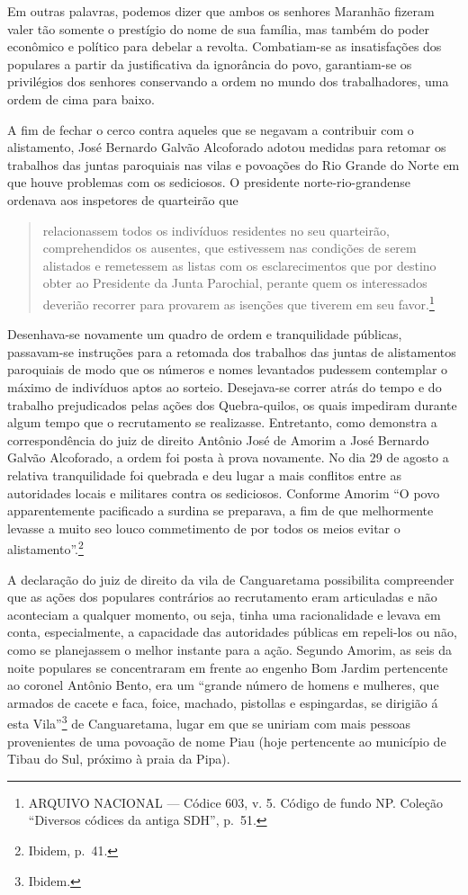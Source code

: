 \begin{refsection}
Em outras palavras, podemos dizer que ambos os senhores Maranhão fizeram valer tão somente o prestígio do nome de sua família, mas também do poder econômico e político para debelar a revolta. Combatiam-se as insatisfações dos populares a partir da justificativa da ignorância do povo, garantiam-se os privilégios dos senhores conservando a ordem no mundo dos trabalhadores, uma ordem de cima para baixo. 

A fim de fechar o cerco contra aqueles que se negavam a contribuir com o alistamento, José Bernardo Galvão Alcoforado adotou medidas para retomar os trabalhos das juntas paroquiais nas vilas e povoações do Rio Grande do Norte em que houve problemas com os sediciosos. O presidente norte-rio-grandense ordenava aos inspetores de quarteirão que  

\begin{quote}
    relacionassem todos os indivíduos residentes no seu quarteirão, comprehendidos os ausentes, que estivessem nas condições de serem alistados e remetessem  as listas com os esclarecimentos que por destino obter ao Presidente da Junta Parochial, perante quem os interessados deverião recorrer para provarem as isenções que tiverem em seu favor.\footnote{ARQUIVO NACIONAL --- Códice 603, v. 5. Código de fundo NP. Coleção “Diversos códices da antiga SDH”, p.~51.}
\end{quote}

Desenhava-se novamente um quadro de ordem e tranquilidade públicas, passavam-se instruções para a retomada dos trabalhos das juntas de alistamentos paroquiais de modo que os números e nomes levantados pudessem contemplar o máximo de indivíduos aptos ao sorteio. Desejava-se correr atrás do tempo e do trabalho prejudicados pelas ações dos Quebra-quilos, os quais impediram durante algum tempo que o recrutamento se realizasse. Entretanto, como demonstra a correspondência do juiz de direito Antônio José de Amorim a José Bernardo Galvão Alcoforado, a ordem foi posta à prova novamente. No dia 29 de agosto a relativa tranquilidade foi quebrada e deu lugar a mais conflitos entre as autoridades locais e militares contra os sediciosos. Conforme Amorim “O povo apparentemente pacificado a surdina se preparava, a fim de que melhormente levasse a muito seo louco commetimento de por todos os meios evitar o alistamento”.\footnote{Ibidem, p.~41.} 

A declaração do juiz de direito da vila de Canguaretama possibilita compreender que as ações dos populares contrários ao recrutamento eram articuladas e não aconteciam a qualquer momento, ou seja, tinha uma racionalidade e levava em conta, especialmente, a capacidade das autoridades públicas em repeli-los ou não, como se planejassem o melhor instante para a ação. Segundo Amorim, as seis da noite populares se concentraram em frente ao engenho Bom Jardim pertencente ao coronel Antônio Bento, era um “grande número de homens e mulheres, que armados de cacete e faca, foice, machado, pistollas e espingardas, se dirigião á esta Vila”\footnote{Ibidem.} de Canguaretama, lugar em que se uniriam com mais pessoas provenientes de uma povoação de nome Piau (hoje pertencente ao município de Tibau do Sul, próximo à praia da Pipa).


\end{refsection}
